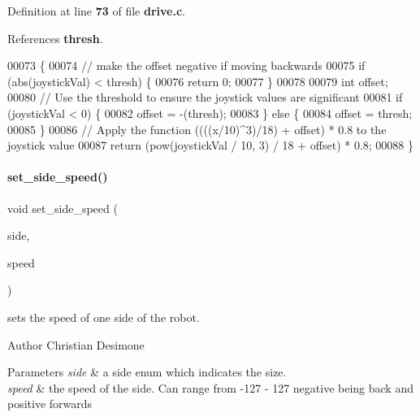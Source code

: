 Definition at line \textbf{ 73} of file \textbf{ drive.\+c}.



References \textbf{ thresh}.


\begin{DoxyCode}
00073                                           \{
00074   \textcolor{comment}{// make the offset negative if moving backwards}
00075   \textcolor{keywordflow}{if} (abs(joystickVal) < thresh) \{
00076     \textcolor{keywordflow}{return} 0;
00077   \}
00078 
00079   \textcolor{keywordtype}{int} offset;
00080   \textcolor{comment}{// Use the threshold to ensure the joystick values are significant}
00081   \textcolor{keywordflow}{if} (joystickVal < 0) \{
00082     offset = -(thresh);
00083   \} \textcolor{keywordflow}{else} \{
00084     offset = thresh;
00085   \}
00086   \textcolor{comment}{// Apply the function ((((x/10)^3)/18) + offset) * 0.8 to the joystick value}
00087   \textcolor{keywordflow}{return} (pow(joystickVal / 10, 3) / 18 + offset) * 0.8;
00088 \}
\end{DoxyCode}
\mbox{\label{drive_8c_a8df41fd50094c065eedc81fc5e6595d1}} 
\paragraph{set\+\_\+side\+\_\+speed()}
{\footnotesize\ttfamily void set\+\_\+side\+\_\+speed (\begin{DoxyParamCaption}\item[{\textbf{ side\+\_\+t}}]{side,  }\item[{int}]{speed }\end{DoxyParamCaption})}



sets the speed of one side of the robot. 

\begin{DoxyAuthor}{Author}
Christian Desimone 
\end{DoxyAuthor}

\begin{DoxyParams}{Parameters}
{\em side} & a side enum which indicates the size. \\
\hline
{\em speed} & the speed of the side. Can range from -\/127 -\/ 127 negative being back and positive forwards \\
\hline
\end{DoxyParams}


